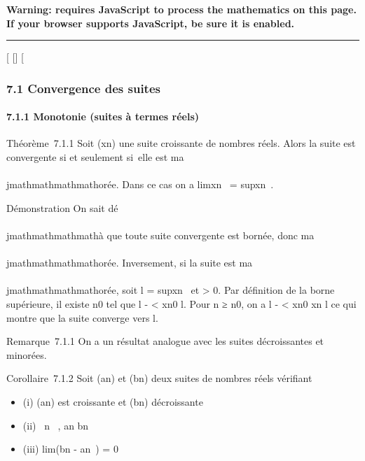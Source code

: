 \textbf{Warning: 
requires JavaScript to process the mathematics on this page.\\ If your
browser supports JavaScript, be sure it is enabled.}

\begin{center}\rule{3in}{0.4pt}\end{center}

{[}
{[}{]}
{[}

\subsubsection{7.1 Convergence des suites}

\paragraph{7.1.1 Monotonie (suites à termes réels)}

Théorème~7.1.1 Soit (xn) une suite croissante de nombres
réels. Alors la suite est convergente si et seulement si~elle est
ma\\\\jmathmathmathmathorée. Dans ce cas on a limxn~
= supxn~.

Démonstration On sait dé\\\\jmathmathmathmathà que toute suite convergente est bornée, donc
ma\\\\jmathmathmathmathorée. Inversement, si la suite est ma\\\\jmathmathmathmathorée, soit l
= supxn~ et \epsilon \textgreater{} 0. Par
définition de la borne supérieure, il existe n0 tel que l - \epsilon
\textless{} xn0 \leq l. Pour n ≥ n0, on a l -
\epsilon \textless{} xn0 \leq xn \leq l ce qui montre
que la suite converge vers l.

Remarque~7.1.1 On a un résultat analogue avec les suites décroissantes
et minorées.

Corollaire~7.1.2 Soit (an) et (bn) deux suites de
nombres réels vérifiant

\begin{itemize}
\itemsep1pt\parskip0pt
\item
  (i) (an) est croissante et (bn) décroissante
\item
  (ii) \forall~n \in {}~, an \leq bn~
\item
  (iii) lim(bn - an~) = 0
\end{itemize}

